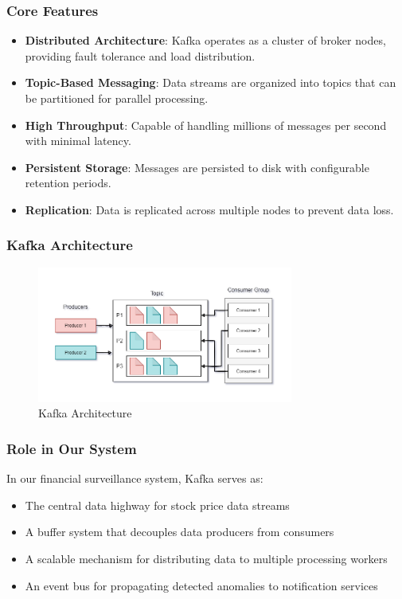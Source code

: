\subsubsection{Core Features}
\begin{itemize}
    \item \textbf{Distributed Architecture}: Kafka operates as a cluster of broker nodes, providing fault tolerance and load distribution.
    \item \textbf{Topic-Based Messaging}: Data streams are organized into topics that can be partitioned for parallel processing.
    \item \textbf{High Throughput}: Capable of handling millions of messages per second with minimal latency.
    \item \textbf{Persistent Storage}: Messages are persisted to disk with configurable retention periods.
    \item \textbf{Replication}: Data is replicated across multiple nodes to prevent data loss.
\end{itemize}

\subsubsection{Kafka Architecture}

\begin{figure}[H]
    \centering
    \includegraphics[width=0.75\textwidth]{figures/kafka.png}
    \caption{Kafka Architecture}
    \label{fig:kafka_architecture}
\end{figure}

\subsubsection{Role in Our System}
In our financial surveillance system, Kafka serves as:
\begin{itemize}
    \item The central data highway for stock price data streams
    \item A buffer system that decouples data producers from consumers
    \item A scalable mechanism for distributing data to multiple processing workers
    \item An event bus for propagating detected anomalies to notification services
\end{itemize}

